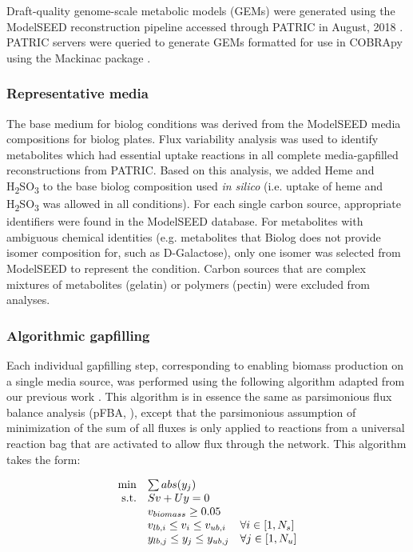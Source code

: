 \documentclass[11pt,onecolumn,notitlepage,openany,twoside]{book}
\begin{document}
\begin{refsection}
Draft-quality genome-scale metabolic models (GEMs) were generated using the ModelSEED reconstruction pipeline \cite{Henry2010-um} accessed through PATRIC in August, 2018 \cite{Wattam2017-tk}. PATRIC servers were queried to generate GEMs formatted for use in COBRApy \cite{Ebrahim2013-eb} using the Mackinac package \cite{Mundy2017-eb}.

\subsubsection{Representative media}

The base medium for biolog conditions was derived from the ModelSEED media compositions for biolog plates. Flux variability analysis was used to identify metabolites which had essential uptake reactions in all complete media-gapfilled reconstructions from PATRIC. Based on this analysis, we added Heme and H\textsubscript{2}SO\textsubscript{3} to the base biolog composition used \textit{in silico} (i.e. uptake of heme and H\textsubscript{2}SO\textsubscript{3} was allowed in all conditions). For each single carbon source, appropriate identifiers were found in the ModelSEED database. For metabolites with ambiguous chemical identities (e.g. metabolites that Biolog does not provide isomer composition for, such as D-Galactose), only one isomer was selected from ModelSEED to represent the condition. Carbon sources that are complex mixtures of metabolites (gelatin) or polymers (pectin) were excluded from analyses.

\subsubsection{Algorithmic gapfilling}

Each individual gapfilling step, corresponding to enabling biomass production on a single media source, was performed using the following algorithm adapted from our previous work \cite{Biggs2017-md}. This algorithm is in essence the same as parsimonious flux balance analysis (pFBA, \cite{Lewis2010-xs}), except that the parsimonious assumption of minimization of the sum of all fluxes is only applied to reactions from a universal reaction bag that are activated to allow flux through the network. This algorithm takes the form:

\begin{equation*}
\begin{array}{rlll}
\min & \multicolumn{2}{l} {\sum abs(y_j) } \\
\textrm{s.t.} &	Sv + Uy = 0	 \\
&	v_{biomass} \geq 0.05 \\
&	v_{lb,i} \leq v_i \leq v_{ub,i}	& 	\forall i \in [1, N_s] \\
&	y_{lb,j} \leq y_j \leq y_{ub,j}	&	\forall j \in [1, N_u] \\
\end{array}
\end{equation*}


\end{refsection}
\end{document}
